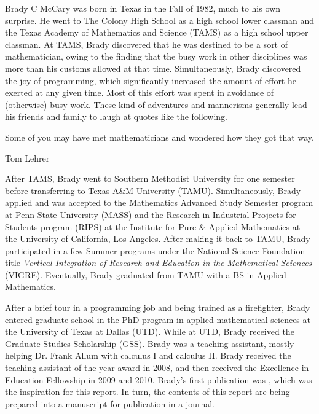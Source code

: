 Brady C McCary was born in Texas in the Fall of 1982, much to his own surprise.
He went to The Colony High School as a high school lower classman and the 
Texas Academy of Mathematics and Science (TAMS) as a high school upper classman.
At TAMS, Brady discovered that he was destined to be a sort of mathematician,
owing to the finding that the busy work in other disciplines was more than his
customs allowed at that time.
Simultaneously, Brady discovered the joy of programming, which significantly
increased the amount of effort he exerted at any given time. Most of this effort
was spent in avoidance of (otherwise) busy work. These kind of adventures
and mannerisms generally lead his friends and family to laugh at quotes like the following.

\begin{flushright}
    \begin{minipage}{7.6cm}
        Some of you may have met mathematicians and wondered how they got that way.
        \par
        \mbox{} \hfill Tom Lehrer
    \end{minipage}
\end{flushright}

After TAMS, Brady went to Southern Methodist University for one semester
before transferring to Texas A\&M University (TAMU). Simultaneously, Brady applied
and was accepted to the Mathematics Advanced Study Semester program at Penn State University (MASS)
and the Research in Industrial Projects for Students program (RIPS) at the
Institute for Pure \& Applied Mathematics at the University of California,
Los Angeles. After making it back to TAMU, Brady participated in a few
Summer programs under the National Science Foundation title
\emph{Vertical Integration of Research and Education in the Mathematical Sciences} (VIGRE).
Eventually, Brady graduated from TAMU with a BS in Applied Mathematics.

After a brief tour in a programming job and being trained as a firefighter,
Brady entered graduate school in the PhD program in applied mathematical
sciences at the University of Texas at Dallas (UTD). While at UTD, Brady
received the Graduate Studies Scholarship (GSS). Brady was a teaching
assistant, mostly helping Dr. Frank Allum with calculus I and calculus II.
Brady received the teaching assistant of the year award in 2008, and then
received the Excellence in Education Fellowship in 2009 and 2010.
Brady's first publication was \citep{mccary:ssiai-2010}, which was the
inspiration for this report. In turn, the contents of this report are
being prepared into a manuscript for publication in a journal.

